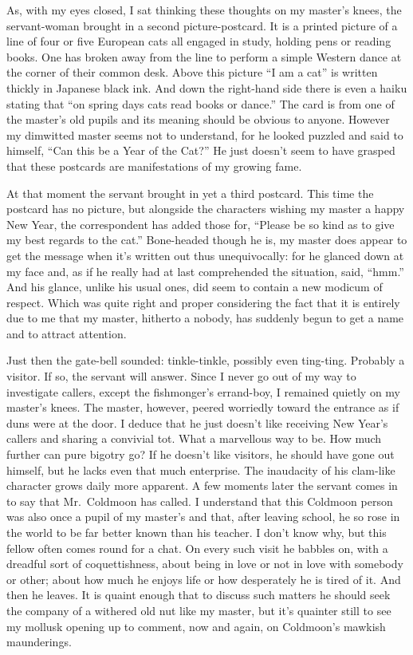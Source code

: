 \documentclass{book}
\begin{document}
As, with my eyes closed, I sat thinking these thoughts on my master's
knees, the servant-woman brought in a second picture-postcard. It is a
printed picture of a line of four or five European cats all engaged in
study, holding pens or reading books. One has broken away from the line
to perform a simple Western dance at the corner of their common desk.
Above this picture ``I am a cat'' is written thickly in Japanese black
ink. And down the right-hand side there is even a haiku stating that
``on spring days cats read books or dance.'' The card is from one of the
master's old pupils and its meaning should be obvious to anyone. However
my dimwitted master seems not to understand, for he looked puzzled and
said to himself, ``Can this be a Year of the Cat?'' He just doesn't seem
to have grasped that these postcards are manifestations of my growing
fame.

At that moment the servant brought in yet a third postcard. This time
the postcard has no picture, but alongside the characters wishing my
master a happy New Year, the correspondent has added those for, ``Please
be so kind as to give my best regards to the cat.'' Bone-headed though
he is, my master does appear to get the message when it's written out
thus unequivocally: for he glanced down at my face and, as if he really
had at last comprehended the situation, said, ``hmm.'' And his glance,
unlike his usual ones, did seem to contain a new modicum of respect.
Which was quite right and proper considering the fact that it is
entirely due to me that my master, hitherto a nobody, has suddenly begun
to get a name and to attract attention.

Just then the gate-bell sounded: tinkle-tinkle, possibly even ting-ting.
Probably a visitor. If so, the servant will answer. Since I never go out
of my way to investigate callers, except the fishmonger's errand-boy, I
remained quietly on my master's knees. The master, however, peered
worriedly toward the entrance as if duns were at the door. I deduce that
he just doesn't like receiving New Year's callers and sharing a
convivial tot. What a marvellous way to be. How much further can pure
bigotry go? If he doesn't like visitors, he should have gone out
himself, but he lacks even that much enterprise. The inaudacity of his
clam-like character grows daily more apparent. A few moments later the
servant comes in to say that Mr.~Coldmoon has called. I understand that
this Coldmoon person was also once a pupil of my master's and that,
after leaving school, he so rose in the world to be far better known
than his teacher. I don't know why, but this fellow often comes round
for a chat. On every such visit he babbles on, with a dreadful sort of
coquettishness, about being in love or not in love with somebody or
other; about how much he enjoys life or how desperately he is tired of
it. And then he leaves. It is quaint enough that to discuss such matters
he should seek the company of a withered old nut like my master, but
it's quainter still to see my mollusk opening up to comment, now and
again, on Coldmoon's mawkish maunderings.
\end{document}
